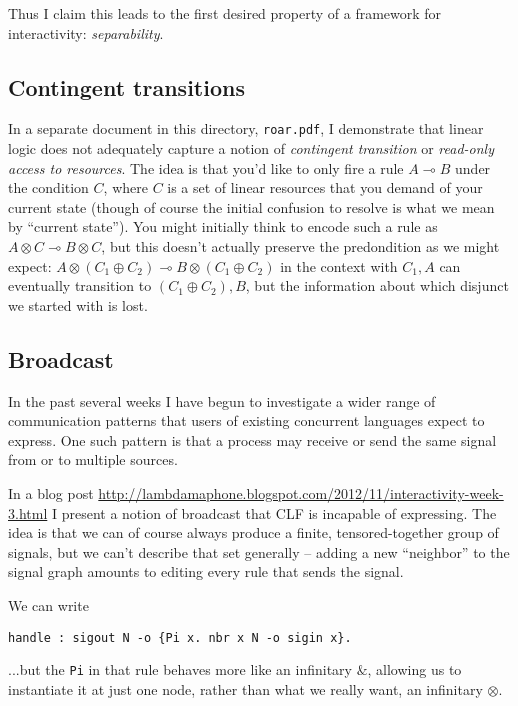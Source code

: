 \documentclass{article}
\newcommand{\lolli}{\multimap}
\newcommand{\tensor}{\otimes}
\begin{document}
Thus I claim this leads to the first desired property of a framework for
interactivity: {\em separability}.

\subsection{Contingent transitions}

In a separate document in this directory, \verb|roar.pdf|, I demonstrate
that linear logic does not adequately capture a notion of {\em contingent
transition} or {\em read-only access to resources}. The idea is that you'd
like to only fire a rule $A \lolli B$ under the condition $C$, where $C$ is
a set of linear resources that you demand of your current state (though of
course the initial confusion to resolve is what we mean by ``current
state''). You might initially think to encode such a rule as $A\tensor C \lolli B
\tensor C$, but this doesn't actually preserve the predondition as we might
expect: $A \tensor (C_1\oplus C_2) \lolli B \tensor (C_1 \oplus C_2)$ in
the context with $C_1, A$ can eventually transition to $(C_1\oplus C_2),
B$, but the information about which disjunct we started with is lost.

\subsection{Broadcast}

In the past several weeks I have begun to investigate a wider range of
communication patterns that users of existing concurrent languages expect
to express. One such pattern is that a process may receive or send the same
signal from or to multiple sources.

In a blog post
\url{http://lambdamaphone.blogspot.com/2012/11/interactivity-week-3.html} I
present a notion of broadcast that CLF is incapable of expressing. The idea
is that we can of course always produce a finite, tensored-together group
of signals, but we can't describe that set generally -- adding a new
``neighbor'' to the signal graph amounts to editing every rule that sends
the signal.

We can write
\begin{verbatim}
handle : sigout N -o {Pi x. nbr x N -o sigin x}.
\end{verbatim}

...but the \verb|Pi| in that rule behaves more like an infinitary 
$\&$, allowing us to instantiate it at just one node, rather than what we
really want, an infinitary $\tensor$.
\end{document}
